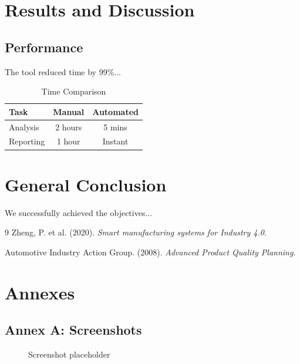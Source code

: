 \documentclass[12pt,a4paper]{report}
\begin{document}
\chapter{Results and Discussion}
\section{Performance}
The tool reduced time by 99\%...

\begin{table}[H]
    \centering
    \caption{Time Comparison}
    \begin{tabular}{lcc}
        \toprule
        \textbf{Task} & \textbf{Manual} & \textbf{Automated} \\
        \midrule
        Analysis & 2 hours & 5 mins \\
        Reporting & 1 hour & Instant \\
        \bottomrule
    \end{tabular}
\end{table}

\chapter*{General Conclusion}
We successfully achieved the objectives...

\begin{thebibliography}{9}
    Zheng, P. et al. (2020). \textit{Smart manufacturing systems for Industry 4.0}.
    
    Automotive Industry Action Group. (2008). \textit{Advanced Product Quality Planning}.
\end{thebibliography}

\chapter*{Annexes}

\section*{Annex A: Screenshots}
\begin{figure}[H]
    \centering
    \caption{Screenshot placeholder}
\end{figure}
\end{document}
